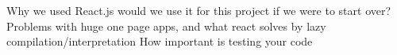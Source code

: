 \begin{disposition}

Why we used React.js would we use it for this project if we were to start over?
Problems with huge one page apps, and what react solves by lazy compilation/interpretation
How important is testing your code



\end{disposition}